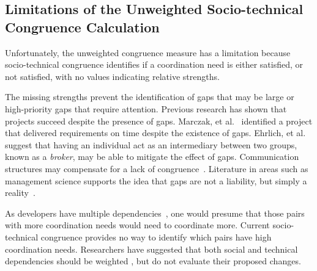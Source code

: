 \subsection{Limitations of the Unweighted Socio-technical Congruence Calculation}
 
Unfortunately, the unweighted congruence measure has a limitation because socio-technical congruence identifies if a coordination need is either satisfied, or not satisfied, with no values indicating relative strengths.

The missing strengths prevent the identification of gaps that may be large or high-priority gaps that require attention.  Previous research has shown that projects succeed despite the presence of gaps. Marczak, et al.~\cite{marczak:re:2008} identified a project that delivered requirements on time despite the existence of gaps. 
Ehrlich, et al.~\cite{ehrlich2008:gaps} suggest that having an individual act as an intermediary between two groups, known as a \emph{broker}, may be able to mitigate the effect of gaps.
Communication structures may compensate for a lack of congruence~\cite{hinds:cscw:2006}. Literature in areas such as management science supports the idea that gaps are not a liability, but simply a reality~\cite{deSouza2004:thwarts_collaboration,hossain:cscw:2006}.

As developers have multiple dependencies~\cite{desouza2007:awarenessnetwork,mockus2002:opensource}, one would presume that those pairs with more coordination needs would need to coordinate more. Current socio-technical congruence provides no way to identify which pairs have high coordination needs. Researchers have suggested that both social and technical dependencies should be weighted \cite{valetto:msr:2007,kwan2009:weighted}, 
but do not evaluate their proposed changes.







